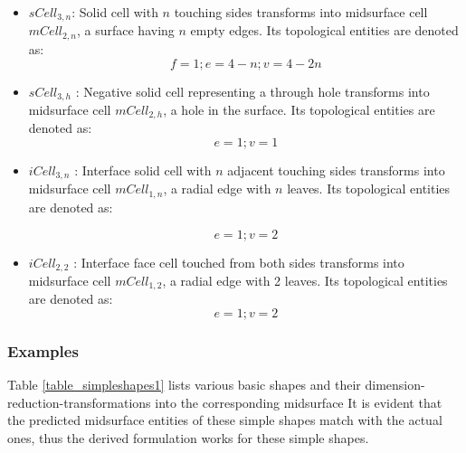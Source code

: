\begin{itemize}
[noitemsep,topsep=2pt,parsep=2pt,partopsep=2pt]

	\item  $sCell_{3,n}$:	Solid cell with $n$ touching sides transforms into midsurface cell   $mCell_{2,n}$, a surface having $n$ empty edges. Its topological entities are denoted as:
\begin{equation}
f=1;
e=4-n;
v=4-2n
\label{eqn_cellularna}
\end{equation} 

	\item   $sCell_{3,h}$ : Negative solid  cell representing a through hole transforms into midsurface cell  $mCell_{2,h}$, a hole in the surface. Its topological entities are denoted as:
\begin{equation}
e=1; v=1
\label{eqn_cellularah}
\end{equation} 

	\item $iCell_{3,n}$ :	Interface solid cell with $n$ adjacent touching sides transforms into midsurface cell  $mCell_{1,n}$, a radial edge with $n$ leaves. Its topological entities are denoted as:

\begin{equation}
e=1;
v=2
\label{eqn_cellulara}
\end{equation}

	\item  $iCell_{2,2}$ :	Interface face cell touched from both sides  transforms into midsurface cell  $mCell_{1,2}$, a radial edge with 2 leaves. Its topological entities are denoted as:
\begin{equation}
e=1;
v=2
\label{eqn_cellularaf}
\end{equation}


\end{itemize}


\subsubsection{Examples}
Table \ref{table_simpleshapes1} lists various basic shapes and their dimension-reduction-transformations into the corresponding midsurface
It is evident that the predicted midsurface entities of these simple shapes match with the actual ones, thus the derived formulation works for these simple shapes. 

